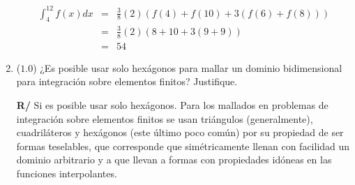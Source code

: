 \documentclass[12pt]{article}
\begin{document}
\begin{enumerate}[leftmargin=*,widest=9]
\begin{eqnarray*}
\int^{12}_4 f(x)dx  &=& \frac{3}{8}(2)\left(f(4) + f(10) + 3 (f(6) + f(8)) \right)\\
&=&\frac{3}{8}(2)\left(8 + 10 + 3 (9 + 9) \right) \\
&=&54
\end{eqnarray*}

        
   \item (\(1.0\)) ¿Es posible usar solo hexágonos para mallar un dominio bidimensional para integración sobre elementos finitos? Justifique.
   
  \textbf{R/} Si es posible usar solo hexágonos. Para los mallados en problemas de integración sobre elementos finitos se usan triángulos (generalmente), cuadriláteros y hexágonos (este último poco común) por su propiedad de ser formas teselables, que corresponde que simétricamente llenan con facilidad un dominio arbitrario y a que llevan a formas con propiedades idóneas en las funciones interpolantes.
  \end{enumerate}
\end{document}
